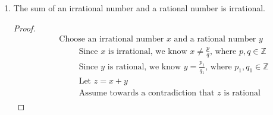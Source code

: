 \documentclass{article}
\begin{document}
\begin{enumerate}
\begin{enumerate}
\begin{proof}
\begin{align}
                &\quad \hspace{1cm} \text{Since } st \text{, we know } st = (x_1x_2 + 2y_1y_2) + \sqrt{2}(x_1y_2 + x_2y_1) \\
                &\quad \hspace{1cm} \text{Let } a = x_1x_2 + 2y_1y_2 \text{ and } b = x_1y_2 + x_2y_1 \\
                &\quad \hspace{1cm} \text{Since } x_1,x_2,y_1,y_2 \in \mathbb{Q} \text{, we know } a,b \in \mathbb{Q} \\
                &\quad \hspace{1cm} \text{Since } st = a+b \sqrt{2} \text{ and } a,b \in \mathbb{Q} \text{, we know } S \subseteq T \\
                &\quad \text{Choose } t \in T \text{ where } t = x + y \sqrt{2} \text{, and } x,y \in \mathbb{Q} \\
                &\quad \hspace{1cm} \text{Since } t \in T \text{, we know } t = 1 \cdot t \text{, where } 1 \in \mathbb{Q} \\
                &\quad \hspace{1cm} \text{Since } t = 1 \cdot t \text{, we know } t \in S \text{, so } T \subseteq S \\
                &\quad \text{Since } S \subseteq T \text{ and } T \subseteq S \text{, we know } S = T
            \end{align}
        \end{proof}
        \item The sum of an irrational number and a rational number is irrational.
        \begin{proof}
            \begin{align}
                &\quad \text{Choose an irrational number } x \text{ and a rational number } y \\
                &\quad \hspace{1cm} \text{Since } x \text{ is irrational, we know } x \neq \frac{p}{q} \text{, where } p,q \in \mathbb{Z} \\
                &\quad \hspace{1cm} \text{Since } y \text{ is rational, we know } y = \frac{p_1}{q_1} \text{, where } p_1,q_1 \in \mathbb{Z} \\
                &\quad \hspace{1cm} \text{Let } z = x + y \\
                &\quad \hspace{1cm} \text{Assume towards a contradiction that } z \text{ is rational} \\

\end{align}
\end{proof}
\end{enumerate}
\end{enumerate}
\end{document}
